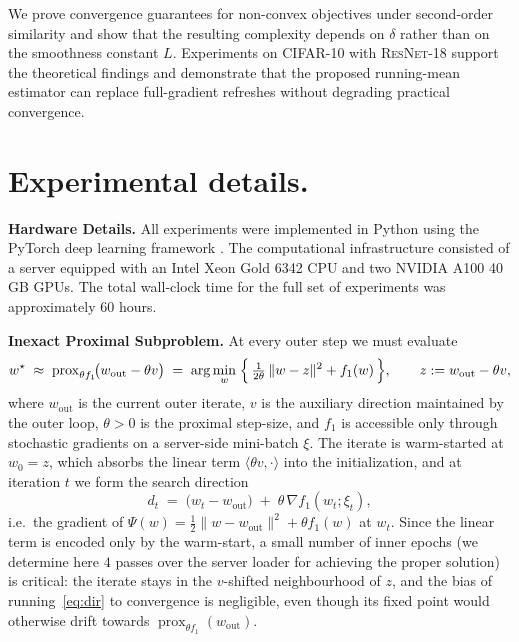 \documentclass{article}
\begin{document}
We prove convergence guarantees for non-convex objectives under second-order similarity and show that the resulting complexity depends on $\delta$ rather than on the smoothness constant $L$. Experiments on \textsc{CIFAR-10} with \textsc{ResNet-18} support the theoretical findings and demonstrate that the proposed running-mean estimator can replace full-gradient refreshes without degrading practical convergence.





\newpage


\newpage
\appendix

\section{Experimental details.} \label{ap:exp}

\textbf{Hardware Details.} All experiments were implemented in Python using the PyTorch deep learning framework \citep{torch}. The computational infrastructure consisted of a server equipped with an Intel Xeon Gold 6342 CPU and two NVIDIA A100 40 GB GPUs. The total wall‑clock time for the full set of experiments was approximately $60$ hours.

\textbf{Inexact Proximal Subproblem.}
At every outer step we must evaluate
\begin{equation}
w^{\star}\;\approx\;\operatorname{prox}_{\theta f_{1}}\!\bigl(w_{\mathrm{out}}-\theta v\bigr)
\;=\;\arg\min_{w}\;\Bigl\{\,\tfrac{1}{2\theta}\,\|w-z\|^{2}+f_{1}(w)\,\Bigr\},
\qquad z := w_{\mathrm{out}}-\theta v,
\label{eq:prox}
\end{equation}
where $w_{\mathrm{out}}$ is the current outer iterate, $v$ is the auxiliary direction maintained by the outer loop, $\theta>0$ is the proximal step-size, and $f_{1}$ is accessible only through stochastic gradients on a server-side mini-batch $\xi$.
The iterate is warm-started at $w_{0}=z$, which absorbs the linear term $\langle\theta v,\cdot\rangle$ into the initialization, and at iteration $t$ we form the search direction
\begin{equation}
d_{t}\;=\;\bigl(w_{t}-w_{\mathrm{out}}\bigr)\;+\;\theta\,\nabla f_{1}(w_{t};\xi_{t}),
\label{eq:dir}
\end{equation}
i.e.\ the gradient of $\Psi(w)=\tfrac12\|w-w_{\mathrm{out}}\|^{2}+\theta f_{1}(w)$ at $w_{t}$. Since the linear term is encoded only by the warm-start, a small number of inner epochs (we determine here $4$ passes over the server loader for achieving the proper solution) is critical: the iterate stays in the $v$-shifted neighbourhood of $z$, and the bias of running~\eqref{eq:dir} to convergence is negligible, even though its fixed point would otherwise drift towards $\operatorname{prox}_{\theta f_{1}}(w_{\mathrm{out}})$.
\end{document}
